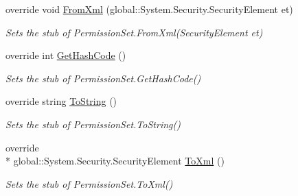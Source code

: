 \begin{DoxyCompactItemize}
override void \hyperlink{class_system_1_1_security_1_1_fakes_1_1_stub_permission_set_a92f7167f70cdcc1df4a988844cea12f5}{From\-Xml} (global\-::\-System.\-Security.\-Security\-Element et)
\begin{DoxyCompactList}\small\item\em Sets the stub of Permission\-Set.\-From\-Xml(\-Security\-Element et)\end{DoxyCompactList}\item 
override int \hyperlink{class_system_1_1_security_1_1_fakes_1_1_stub_permission_set_ac8bf36afc7f2bf25e592e041a3318625}{Get\-Hash\-Code} ()
\begin{DoxyCompactList}\small\item\em Sets the stub of Permission\-Set.\-Get\-Hash\-Code()\end{DoxyCompactList}\item 
override string \hyperlink{class_system_1_1_security_1_1_fakes_1_1_stub_permission_set_a76f7a018329d6e73791a30894042f265}{To\-String} ()
\begin{DoxyCompactList}\small\item\em Sets the stub of Permission\-Set.\-To\-String()\end{DoxyCompactList}\item 
override \\*
global\-::\-System.\-Security.\-Security\-Element \hyperlink{class_system_1_1_security_1_1_fakes_1_1_stub_permission_set_a664ec201f54304058795a32559b3c328}{To\-Xml} ()
\begin{DoxyCompactList}\small\item\em Sets the stub of Permission\-Set.\-To\-Xml()\end{DoxyCompactList}\end{DoxyCompactItemize}
